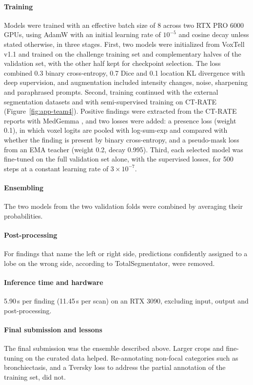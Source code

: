 \paragraph{Training} Models were trained with an effective batch size of 8
across two RTX PRO 6000 GPUs, using AdamW with an initial learning rate of
$10^{-5}$ and cosine decay unless stated otherwise, in three stages. First, two
models were initialized from VoxTell v1.1 and trained on the challenge training
set and complementary halves of the validation set, with the other half kept for
checkpoint selection. The loss combined 0.3 binary cross-entropy, 0.7 Dice and
0.1 location KL divergence with deep supervision, and augmentation included
intensity changes, noise, sharpening and paraphrased prompts. Second, training
continued with the external segmentation datasets and with semi-supervised
training on CT-RATE (Figure~\ref{fig:app-team4}). Positive findings were
extracted from the CT-RATE reports with MedGemma \citep{sellergren2026open}, and
two losses were added: a presence loss (weight 0.1), in which voxel logits are
pooled with log-sum-exp and compared with whether the finding is present by
binary cross-entropy, and a pseudo-mask loss from an EMA teacher (weight 0.2,
decay 0.995). Third, each selected model was fine-tuned on the full validation
set alone, with the supervised losses, for 500 steps at a constant learning rate
of $3 \times 10^{-7}$.

\paragraph{Ensembling} The two models from the two validation folds were
combined by averaging their probabilities.

\paragraph{Post-processing} For findings that name the left or right side,
predictions confidently assigned to a lobe on the wrong side, according to
TotalSegmentator, were removed.

\paragraph{Inference time and hardware} 5.90\,s per finding
(11.45\,s per scan) on an RTX 3090, excluding input, output and
post-processing.

\paragraph{Final submission and lessons} The final submission was the ensemble
described above. Larger crops and fine-tuning on the curated data helped.
Re-annotating non-focal categories such as bronchiectasis, and a Tversky loss to
address the partial annotation of the training set, did not.


